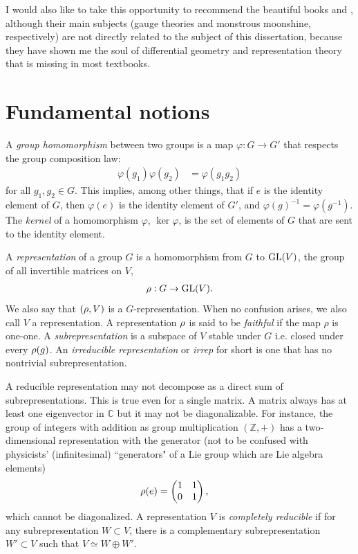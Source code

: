 I would also like to take this opportunity to recommend the beautiful books \cite{baez1994gauge} and \cite{gannon2006moonshine}, although their main subjects (gauge theories and monstrous moonshine, respectively) are not directly related to the subject of this dissertation, because they have shown me the soul of differential geometry and representation theory that is missing in most textbooks.

\section{Fundamental notions}\label{ch2:fundamentals}

A \emph{group homomorphism} between two groups is a map $\varphi:G \to G'$ that respects the group composition law:
\begin{align}
\varphi(g_1)\varphi(g_2) &= \varphi(g_1 g_2)
\end{align}
for all $g_1,g_2 \in G$. This implies, among other things, that if $e$ is the identity element of $G$, then $\varphi(e)$ is the identity element of $G'$, and $\varphi(g)^{-1} = \varphi(g^{-1})$. The \emph{kernel} of a homomorphism $\varphi$, $\ker \varphi$, is the set of elements of $G$ that are sent to the identity element.

A \emph{ representation} of a group $G$ is a homomorphism from $G$ to $\text{GL}(V)$, the group of all invertible matrices on $V$,
\begin{align}
\rho: G \to \text{GL}(V).
\end{align}
We also say that $(\rho,V)$ is a $G$-representation. When no confusion arises, we also call $V$ a representation. A representation $\rho$ is said to be \emph{faithful} if the map $\rho$ is one-one. A \emph{subrepresentation} is a subspace of $V$ stable under $G$ i.e. closed under every $\rho(g)$. An \emph{irreducible representation} or \emph{irrep} for short is one that has no nontrivial subrepresentation.

A reducible representation may not decompose as a direct sum of subrepresentations. This is true even for a single matrix. A matrix always has at least one eigenvector in $\mathbb{C}$ but it may not be diagonalizable. For instance, the group of integers with addition as group multiplication $(\mathbb{Z},+)$ has a two-dimensional representation with the generator (not to be confused with physicists' (infinitesimal) ``generators" of a Lie group which are Lie algebra elements)
\begin{align}
\rho(e) &= \begin{pmatrix}
1 & 1 \\
0 & 1
\end{pmatrix},
\end{align}
which cannot be diagonalized. A representation $V$ is \emph{completely reducible} if for any subrepresentation $W \subset V$, there is a complementary subrepresentation $W'\subset V$ such that $V \simeq W \oplus W'$.


